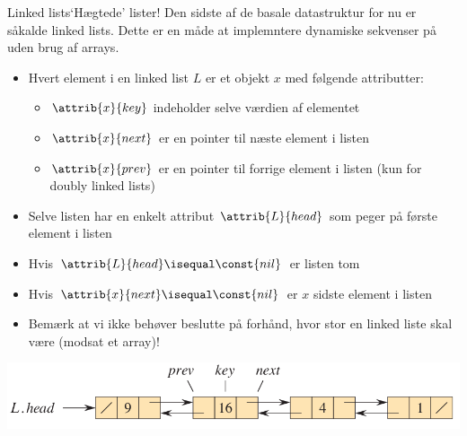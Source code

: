 \documentclass[aspectratio=1610]{beamer}
\begin{document}
\begin{frame}{Linked lists}{`Hægtede' lister!}
    Den sidste af de basale datastruktur for nu er såkalde \alert{linked lists}.
    Dette er en måde at implemntere dynamiske sekvenser på uden brug af arrays.

    \begin{itemize}[<+->]
        \item Hvert element i en linked list $L$ er et \alert{objekt} $x$ med følgende
            attributter:
            \begin{itemize}
                \item $\attrib{x}{key}$ indeholder selve værdien af elementet
                \item $\attrib{x}{next}$ er en pointer til næste element i listen
                \item $\attrib{x}{prev}$ er en pointer til forrige element i
                    listen (kun for \alert{doubly linked lists})
            \end{itemize}
        \item Selve listen har en enkelt attribut $\attrib{L}{head}$ som peger
            på første element i listen
        \item Hvis $\attrib{L}{head} \isequal \const{nil}$ er listen tom
        \item Hvis $\attrib{x}{next} \isequal \const{nil}$ er $x$ sidste element i
            listen
        \item Bemærk at vi ikke behøver beslutte på forhånd, hvor stor en linked
            liste skal være (modsat et array)!
    \end{itemize}

    \centerline{%
        \includegraphics[width=.7\textwidth]{linked-list-example/linked-a}
    }
\end{frame}
\end{document}
